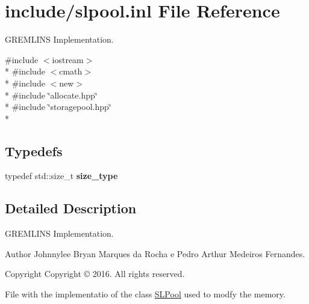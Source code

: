 \hypertarget{slpool_8inl}{}\section{include/slpool.inl File Reference}
\label{slpool_8inl}


G\+R\+E\+M\+L\+I\+NS Implementation.  


{\ttfamily \#include $<$iostream$>$}\\*
{\ttfamily \#include $<$cmath$>$}\\*
{\ttfamily \#include $<$new$>$}\\*
{\ttfamily \#include \char`\"{}allocate.\+hpp\char`\"{}}\\*
{\ttfamily \#include \char`\"{}storagepool.\+hpp\char`\"{}}\\*
\subsection*{Typedefs}
\begin{DoxyCompactItemize}
\item 
typedef std\+::size\+\_\+t {\bfseries size\+\_\+type}\hypertarget{slpool_8inl_a89a6dcafb6130e3e1bcd6d1285e0dd6f}{}\label{slpool_8inl_a89a6dcafb6130e3e1bcd6d1285e0dd6f}

\end{DoxyCompactItemize}


\subsection{Detailed Description}
G\+R\+E\+M\+L\+I\+NS Implementation. 

\begin{DoxyAuthor}{Author}
Johnnylee Bryan Marques da Rocha e Pedro Arthur Medeiros Fernandes. 
\end{DoxyAuthor}
\begin{DoxyCopyright}{Copyright}
Copyright \copyright{} 2016. All rights reserved.
\end{DoxyCopyright}
File with the implementatio of the class \hyperlink{class_s_l_pool}{S\+L\+Pool} used to modfy the memory. 